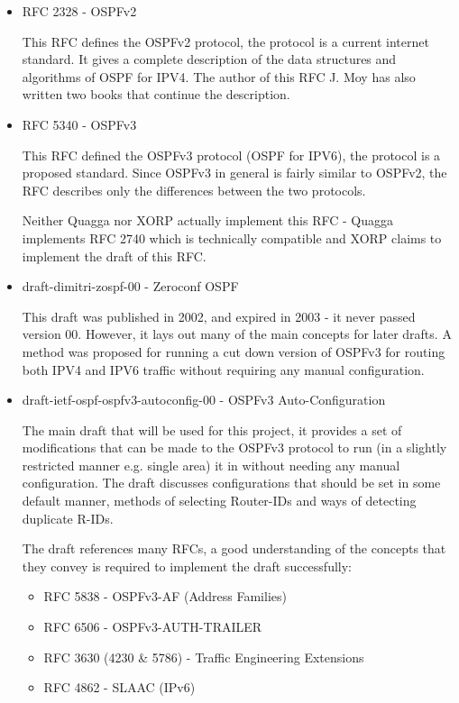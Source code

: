 \documentclass[12pt]{report}
\begin{document}
\begin{itemize}

	\item RFC 2328 - OSPFv2 

	This RFC defines the OSPFv2 protocol, the protocol is a current internet standard. 
	It gives a complete description of the data structures and algorithms of OSPF for IPV4. 
	The author of this RFC J. Moy has also written two books that continue the description. 

	\item RFC 5340 - OSPFv3
	
	This RFC defined the OSPFv3 protocol (OSPF for IPV6), the protocol is a proposed standard. 
	Since OSPFv3 in general is fairly similar to OSPFv2, the RFC describes only the differences between the 
	two protocols. 

	Neither Quagga nor XORP actually implement this RFC - Quagga implements RFC 2740 which is technically compatible and
	XORP claims to implement the draft of this RFC. 

	\item draft-dimitri-zospf-00 - Zeroconf OSPF

	This draft was published in 2002, and expired in 2003 - it never passed version 00. 
	However, it lays out many of the main concepts for later drafts. 
	A method was proposed for running a cut down version of OSPFv3 for routing both IPV4 and IPV6 traffic without requiring 
	any manual configuration. 

	\item draft-ietf-ospf-ospfv3-autoconfig-00 - OSPFv3 Auto-Configuration 
	
	The main draft that will be used for this project, it provides a set of modifications that can be made to 
	the OSPFv3 protocol to run (in a slightly restricted manner e.g. single area) it in without needing any manual configuration. 
	The draft discusses configurations that should be set in some default manner, methods of selecting Router-IDs 
	and ways of detecting duplicate R-IDs. 

	The draft references many RFCs, a good understanding of the concepts that they convey is required 
	to implement the draft successfully:

	\begin{itemize}
			\item RFC 5838 - OSPFv3-AF (Address Families)
			\item RFC 6506 - OSPFv3-AUTH-TRAILER
			\item RFC 3630 (4230 \& 5786) - Traffic Engineering Extensions
			\item RFC 4862 - SLAAC (IPv6)
	\end{itemize}
	


\end{itemize}
\end{document}
